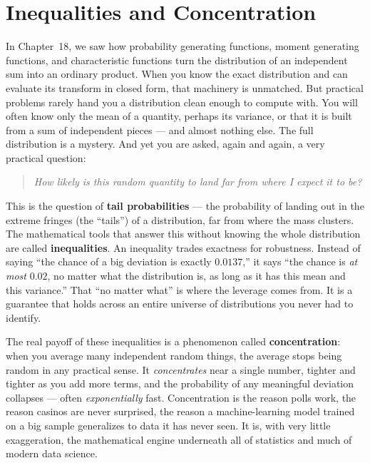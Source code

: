 \chapter{Inequalities and Concentration}

In Chapter~18, we saw how probability generating functions, moment generating
functions, and characteristic functions turn the distribution of an independent
sum into an ordinary product.
When you know the exact distribution and can evaluate its transform in closed
form, that machinery is unmatched. But practical problems rarely hand you a
distribution clean enough to compute with. You will often know only the mean of
a quantity, perhaps its variance, or that it is built from a sum of independent
pieces --- and almost nothing else. The full distribution is a mystery. And yet
you are asked, again and again, a very practical question:

\begin{quote}
\emph{How likely is this random quantity to land far from where I expect it
to be?}
\end{quote}

This is the question of \textbf{tail probabilities} --- the probability of
landing out in the extreme fringes (the ``tails'') of a distribution, far from
where the mass clusters. The mathematical tools that answer this without
knowing the whole distribution are called \textbf{inequalities}. An
inequality trades exactness for robustness. Instead of saying ``the chance of
a big deviation is exactly $0.0137$,'' it says ``the chance is \emph{at most}
$0.02$, no matter what the distribution is, as long as it has this mean and
this variance.'' That ``no matter what'' is where the leverage comes from. It
is a guarantee that holds across an entire universe of distributions you never
had to identify.

The real payoff of these inequalities is a phenomenon called
\textbf{concentration}: when you average many independent random things, the
average stops being random in any practical sense. It \emph{concentrates}
near a single number, tighter and tighter as you add more terms, and the
probability of any meaningful deviation collapses --- often
\emph{exponentially} fast. Concentration is the reason polls work, the reason
casinos are never surprised, the reason a machine-learning model trained on a
big sample generalizes to data it has never seen. It is, with very little
exaggeration, the mathematical engine underneath all of statistics and much of
modern data science.

